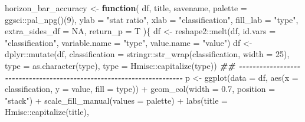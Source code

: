 \documentclass[
]{article}
\newenvironment{Shaded}{\begin{snugshade}}{\end{snugshade}}
\newcommand{\AttributeTok}[1]{\textcolor[rgb]{0.77,0.63,0.00}{#1}}
\newcommand{\ConstantTok}[1]{\textcolor[rgb]{0.00,0.00,0.00}{#1}}
\newcommand{\ControlFlowTok}[1]{\textcolor[rgb]{0.13,0.29,0.53}{\textbf{#1}}}
\newcommand{\DecValTok}[1]{\textcolor[rgb]{0.00,0.00,0.81}{#1}}
\newcommand{\DocumentationTok}[1]{\textcolor[rgb]{0.56,0.35,0.01}{\textbf{\textit{#1}}}}
\newcommand{\FloatTok}[1]{\textcolor[rgb]{0.00,0.00,0.81}{#1}}
\newcommand{\FunctionTok}[1]{\textcolor[rgb]{0.00,0.00,0.00}{#1}}
\newcommand{\NormalTok}[1]{#1}
\newcommand{\OtherTok}[1]{\textcolor[rgb]{0.56,0.35,0.01}{#1}}
\newcommand{\SpecialCharTok}[1]{\textcolor[rgb]{0.00,0.00,0.00}{#1}}
\newcommand{\StringTok}[1]{\textcolor[rgb]{0.31,0.60,0.02}{#1}}
\begin{document}
\begin{Shaded}
\begin{Highlighting}[]
\NormalTok{horizon\_bar\_accuracy }\OtherTok{\textless{}{-}} 
  \ControlFlowTok{function}\NormalTok{(}
\NormalTok{           df,}
\NormalTok{           title,}
\NormalTok{           savename,}
           \AttributeTok{palette =}\NormalTok{ ggsci}\SpecialCharTok{::}\FunctionTok{pal\_npg}\NormalTok{()(}\DecValTok{9}\NormalTok{),}
           \AttributeTok{ylab =} \StringTok{"stat ratio"}\NormalTok{,}
           \AttributeTok{xlab =} \StringTok{"classification"}\NormalTok{,}
           \AttributeTok{fill\_lab =} \StringTok{"type"}\NormalTok{,}
           \AttributeTok{extra\_sides\_df =} \ConstantTok{NA}\NormalTok{,}
           \AttributeTok{return\_p =}\NormalTok{ T}
\NormalTok{           )\{}
\NormalTok{    df }\OtherTok{\textless{}{-}}\NormalTok{ reshape2}\SpecialCharTok{::}\FunctionTok{melt}\NormalTok{(df, }\AttributeTok{id.vars =} \StringTok{"classification"}\NormalTok{,}
                         \AttributeTok{variable.name =} \StringTok{"type"}\NormalTok{,}
                         \AttributeTok{value.name =} \StringTok{"value"}\NormalTok{)}
\NormalTok{    df }\OtherTok{\textless{}{-}}\NormalTok{ dplyr}\SpecialCharTok{::}\FunctionTok{mutate}\NormalTok{(df, }\AttributeTok{classification =}\NormalTok{ stringr}\SpecialCharTok{::}\FunctionTok{str\_wrap}\NormalTok{(classification, }\AttributeTok{width =} \DecValTok{25}\NormalTok{),}
                        \AttributeTok{type =} \FunctionTok{as.character}\NormalTok{(type),}
                        \AttributeTok{type =}\NormalTok{ Hmisc}\SpecialCharTok{::}\FunctionTok{capitalize}\NormalTok{(type))}
    \DocumentationTok{\#\# {-}{-}{-}{-}{-}{-}{-}{-}{-}{-}{-}{-}{-}{-}{-}{-}{-}{-}{-}{-}{-}{-}{-}{-}{-}{-}{-}{-}{-}{-}{-}{-}{-}{-}{-}{-}{-}{-}{-}{-}{-}{-}{-}{-}{-}{-}{-}{-}{-}{-}{-}{-}{-}{-}{-}{-}{-}{-}{-}{-}{-}{-}{-}{-}{-}{-}{-}{-}{-}{-} }
\NormalTok{    p }\OtherTok{\textless{}{-}} \FunctionTok{ggplot}\NormalTok{(}\AttributeTok{data =}\NormalTok{ df,}
                \FunctionTok{aes}\NormalTok{(}\AttributeTok{x =}\NormalTok{ classification,}
                    \AttributeTok{y =}\NormalTok{ value,}
                    \AttributeTok{fill =}\NormalTok{ type)) }\SpecialCharTok{+}
      \FunctionTok{geom\_col}\NormalTok{(}\AttributeTok{width =} \FloatTok{0.7}\NormalTok{,}
               \AttributeTok{position =} \StringTok{"stack"}\NormalTok{) }\SpecialCharTok{+}
      \FunctionTok{scale\_fill\_manual}\NormalTok{(}\AttributeTok{values =}\NormalTok{ palette) }\SpecialCharTok{+}
      \FunctionTok{labs}\NormalTok{(}\AttributeTok{title =}\NormalTok{ Hmisc}\SpecialCharTok{::}\FunctionTok{capitalize}\NormalTok{(title),}

\end{Highlighting}
\end{Shaded}
\end{document}
